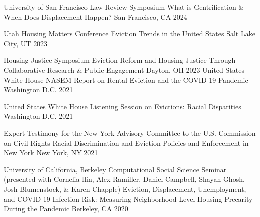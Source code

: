 


\begin{cventries}

  \cventry
    {University of San Francisco Law Review Symposium} %
    {What is Gentrification \& When Does Displacement Happen?} %
    {San Francisco, CA} %
    {2024} %
    {}
    
  \cventry
    {Utah Housing Matters Conference} %
    {Eviction Trends in the United States} %
    {Salt Lake City, UT} %
    {2023} %
    {}

  \cventry
    {Housing Justice Symposium} %
    {Eviction Reform and Housing Justice Through Collaborative Research \& Public Engagement} %
    {Dayton, OH} %
    {2023} %
    {}
  \cventry
    {United States White House} %
    {NASEM Report on Rental Eviction and the COVID-19 Pandemic} %
    {Washington D.C.} %
    {2021} %
    {}

  \cventry
    {United States White House} %
    {Listening Session on Evictions: Racial Disparities} %
    {Washington D.C.} %
    {2021} %
    {}

  \cventry
    {Expert Testimony for the New York Advisory Committee to the U.S. Commission on Civil Rights} %
    {Racial Discrimination and Eviction Policies and Enforcement in New York} %
    {New York, NY} %
    {2021} %
    {}

  \cventry
    {University of California, Berkeley Computational Social Science Seminar (presented with Cornelia Ilin, Alex Ramiller, Daniel Campbell, Shayan Ghosh, Josh Blumenstock, \& Karen Chapple)} %
    {Eviction, Displacement, Unemployment, and COVID-19 Infection Risk: Measuring Neighborhood Level Housing Precarity During the Pandemic} %
    {Berkeley, CA} %
    {2020} %
    {}


\end{cventries}

